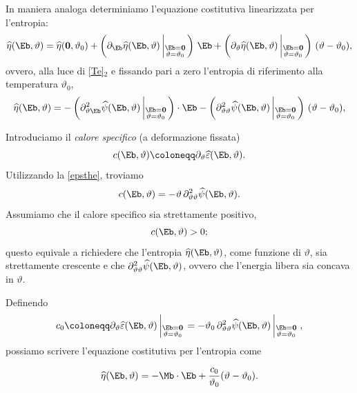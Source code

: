 In maniera analoga determiniamo l'equazione costitutiva linearizzata per l'entropia:
\begin{equation}
\widehat{\eta}(\Eb, \vartheta)=\widehat{\eta}(\mathbf{0}, \vartheta_0)+
\left(\partial_\Eb \widehat{\eta}(\Eb, \vartheta)\left|_{\substack{\Eb=\mathbf{0} \\ \vartheta=\vartheta_0}}\right.\right)\, \Eb+
\left(\partial_\vartheta \widehat{\eta}(\Eb, \vartheta)\left|_{\substack{\Eb=\mathbf{0} \\ \vartheta=\vartheta_0}}\right.\right)\, (\vartheta-\vartheta_0),
\end{equation}
ovvero, alla luce di  \eqref{Te}$_2$ e fissando pari a zero l'entropia di riferimento alla temperatura $\vartheta_0$,
\begin{equation}
\widehat{\eta}(\Eb, \vartheta)=-\left(\partial^2_{\vartheta\Eb} \widehat{\psi}(\Eb, \vartheta)\left|_{\substack{\Eb=\mathbf{0} \\ \vartheta=\vartheta_0}}\right.\right)\cdot \Eb-
\left(\partial^2_{\vartheta\vartheta} \widehat{\psi}(\Eb, \vartheta)\left|_{\substack{\Eb=\mathbf{0} \\ \vartheta=\vartheta_0}}\right.\right)\, (\vartheta-\vartheta_0),
\end{equation}

Introduciamo il \textit{calore specifico} (a deformazione fissata)
\begin{equation}
c(\Eb, \vartheta)\coloneqq \partial_\vartheta\widehat{\varepsilon}(\Eb,\vartheta).
\end{equation}
Utilizzando la \eqref{epsthe}, troviamo
\begin{equation}
c(\Eb, \vartheta)= -\vartheta\,\partial^2_{\vartheta\vartheta}\widehat{\psi}(\Eb, \vartheta).
\end{equation}
Assumiamo che il calore specifico sia strettamente positivo,
\begin{equation}
	c(\Eb, \vartheta)>0;
\end{equation}
questo equivale a richiedere che l'entropia $\widehat{\eta}(\Eb, \vartheta)$, come funzione di $\vartheta$, sia strettamente crescente e che $\partial^2_{\vartheta\vartheta}\widehat{\psi}(\Eb, \vartheta)$, ovvero che l'energia libera sia concava in $\vartheta$.

Definendo
\begin{equation}
c_0\coloneqq  \partial_\vartheta \widehat{\varepsilon}(\Eb, \vartheta)\left|_{\substack{\Eb=\mathbf{0} \\ \vartheta=\vartheta_0}}\right.=-\vartheta_0\, \partial^2_{\vartheta\vartheta} \widehat{\psi}(\Eb, \vartheta)\left|_{\substack{\Eb=\mathbf{0} \\ \vartheta=\vartheta_0}}\right.,
\end{equation}
possiamo scrivere l'equazione costitutiva per l'entropia come
\begin{definition}
\begin{equation}
\widehat{\eta}(\Eb, \vartheta)=-\Mb \cdot \Eb+\frac{c_0}{\vartheta_0}(\vartheta-\vartheta_0).
\end{equation}
\end{definition}

